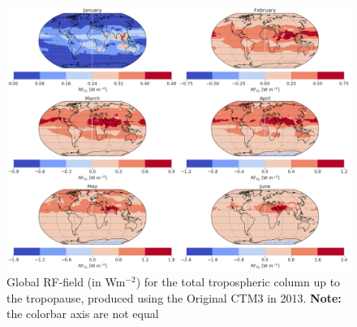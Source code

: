 \begin{figure}[ht]
    \centering
    \includegraphics[width = \linewidth]{Chapter6_Results/images/RF/RF_USE/Appendix/Orig_RF_global_2013.png}
    \caption{Global RF-field (in Wm$^{-2}$) for the total tropospheric column up to the tropopause, produced using the Original CTM3 in 2013. \textbf{Note:} the colorbar axis are not equal}
    \label{fig:orig_RF_global_2013}
\end{figure}